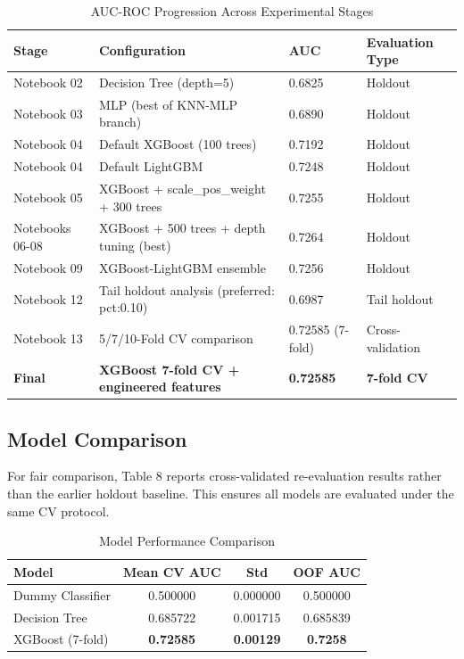 \documentclass[a4paper,11pt]{article}
\begin{document}
\begin{table}[H]
\centering
\caption{AUC-ROC Progression Across Experimental Stages}
\label{tab:progression}
\begin{tabular}{llll}
\toprule
\textbf{Stage} & \textbf{Configuration} & \textbf{AUC} & \textbf{Evaluation Type} \\
\midrule
Notebook 02 & Decision Tree (depth=5) & 0.6825 & Holdout \\
Notebook 03 & MLP (best of KNN-MLP branch) & 0.6890 & Holdout \\
Notebook 04 & Default XGBoost (100 trees) & 0.7192 & Holdout \\
Notebook 04 & Default LightGBM & 0.7248 & Holdout \\
Notebook 05 & XGBoost + scale\_pos\_weight + 300 trees & 0.7255 & Holdout \\
Notebooks 06-08 & XGBoost + 500 trees + depth tuning (best) & 0.7264 & Holdout \\
Notebook 09 & XGBoost-LightGBM ensemble & 0.7256 & Holdout \\
Notebook 12 & Tail holdout analysis (preferred: pct:0.10) & 0.6987 & Tail holdout \\
Notebook 13 & 5/7/10-Fold CV comparison & 0.72585 (7-fold) & Cross-validation \\
\textbf{Final} & \textbf{XGBoost 7-fold CV + engineered features} & \textbf{0.72585} & \textbf{7-fold CV} \\
\bottomrule
\end{tabular}
\end{table}

\subsection{Model Comparison}

For fair comparison, Table 8 reports cross-validated re-evaluation results rather than the earlier holdout baseline. This ensures all models are evaluated under the same CV protocol.

\begin{table}[H]
\centering
\caption{Model Performance Comparison}
\label{tab:comparison}
\begin{tabular}{lccc}
\toprule
\textbf{Model} & \textbf{Mean CV AUC} & \textbf{Std} & \textbf{OOF AUC} \\
\midrule
Dummy Classifier & 0.500000 & 0.000000 & 0.500000 \\
Decision Tree & 0.685722 & 0.001715 & 0.685839 \\
XGBoost (7-fold) & \textbf{0.72585} & \textbf{0.00129} & \textbf{0.7258} \\
\bottomrule
\end{tabular}
\end{table}
\end{document}
